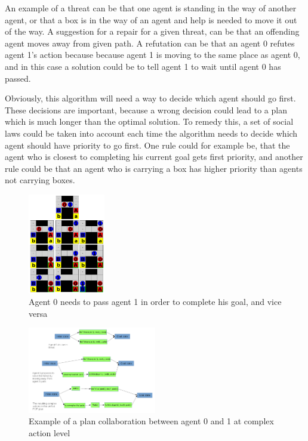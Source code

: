 \documentclass[Main]{subfiles}
\begin{document}
An example of a threat can be that one agent is standing in the way of another agent, or that a box is in the way of an agent and help is needed to move it out of the way.
A suggestion for a repair for a given threat, can be that an offending agent moves away from given path.
A refutation can be that an agent 0 refutes agent 1's action because because agent 1 is moving to the same place as agent 0, and in this case a solution could be to tell agent 1 to wait until agent 0 has passed.

Obviously, this algorithm will need a way to decide which agent should go first. These decisions are important, because a wrong decision could lead to a plan which is much longer than the optimal solution.
To remedy this, a set of social laws could be taken into account each time the algorithm needs to decide which agent should have priority to go first.
One rule could for example be, that the agent who is closest to completing his current goal gets first priority, and another rule could be that an agent who is carrying a box has higher priority than agents not carrying boxes.

\begin{figure}[h!]
	\centering
	\includegraphics[width=0.3\textwidth]{plan_collab.png}
	\caption{Agent 0 needs to pass agent 1 in order to complete his goal, and vice versa}
	\label{fig:plan_collab}
\end{figure}

\begin{figure}[h!]
	\centering
	\includegraphics[width=0.5\textwidth]{unhtnpop.png}
	\caption{Example of a plan collaboration between agent 0 and 1 at complex action level}
	\label{fig:htn_collab}
\end{figure}
\end{document}
